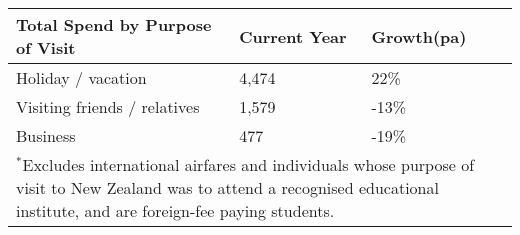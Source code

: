 \begin{tabular}[t]{|p{4cm}|p{2cm}|p{1.2cm}|}
  \hline
Total Spend by Purpose of Visit & Current Year & Growth(pa) \\ 
  \hline
Holiday / vacation & 4,474 & 22\% \\ 
  Visiting friends / relatives & 1,579 & -13\% \\ 
  Business &   477 & -19\% \\ 
   \hline
\multicolumn{3}{p{8.25cm}}{$^*$Excludes international airfares and individuals whose purpose of visit to New Zealand was to attend a recognised educational institute, and are foreign-fee paying students.}\\ 
\end{tabular}
